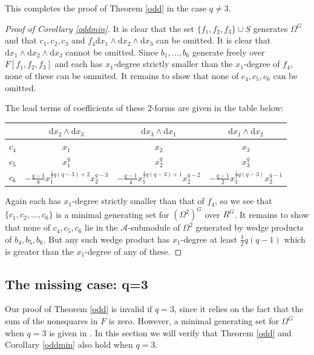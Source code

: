 \documentclass[a4paper]{amsart}
\newcommand{\dd}{\mathrm{d}}
\newtheorem*{Corollary of Conjecture}{Corollary of Conjecture}
\theoremstyle{definition}
\theoremstyle{remark}
\theoremstyle{Acknowledgments}
\begin{document}
This completes the proof of Theorem \ref{odd} in the case $q \neq 3$.

\begin{proof}[Proof of Corollary \ref{oddmin}]
It is clear that the set $\{f_1,f_2,f_3\} \cup S$ generates $\Omega^G$ and that $c_1,c_2,c_3$ and $f_4 \dd x_1 \wedge \dd x_2 \wedge \dd x_3$ can be omitted. It is clear that $\dd x_1 \wedge \dd x_2 \wedge \dd x_3$ cannot be omitted. Since $b_1, \ldots, b_6$ generate freely over $F[f_1,f_2,f_3]$ and each has $x_1$-degree strictly smaller than the $x_1$-degree of $f_4$, none of these can be ommited. It remains to show that none of $c_4,c_5, c_6$ can be omitted.

The lead terms of coefficients of these $2$-forms are given in the table below:

\vspace{1cm}
\begin{tabular}{|c||c|c|c|} \hline
 & $\dd x_2 \wedge \dd x_3$ &  $\dd x_3 \wedge \dd x_1$ &  $\dd x_1 \wedge \dd x_2$ \\ \hline \hline
$c_4$  & $x_1$ & $x_2$  & $x_3$\\ \hline
$c_5$  &  $x_1^q$ &  $x_2^q$ & $x_3^q$\\ \hline
$c_6$  &  $-\frac{q-1}{8}x_1^{\frac12 q(q-3)+2}x_2^{q-3}$ & $-\frac{q-1}{4}x_1^{\frac12 q(q-3)+1}x_2^{q-2}$  & $-\frac{q-1}{2}x_1^{\frac12 q(q-3)}x_2^{q-1}$\\ \hline
\end{tabular}
\vspace{1cm}

Again each has $x_1$-degree strictly smaller than that of $f_4$, so we see that $\{c_1,c_2, \ldots, c_6\}$ is a minimal generating set for $(\Omega^2)^G$ over $R^G$. It remains to show that none of $c_4,c_5,c_6$ lie in the $\mathcal{A}$-submodule of $\Omega^2$ generated by wedge products of $b_4,b_5, b_6$. But any such wedge product has $x_1$-degree at least $\frac12 q(q-1)$ which is greater than the $x_1$-degree of any of these.
 \end{proof}

\subsection{The missing case: q=3}\label{sec:three}

Our proof of Theorem \ref{odd} is invalid if $q=3$, since it relies on the fact that the sum of the nonsquares in $F$ is zero. However, a minimal generating set for $\Omega^G$ when $q=3$ is given in \cite{ElmerMeyer}. In this section we will verify that Theorem \ref{odd} and Corollary \ref{oddmin} also hold when $q=3$.
\end{document}
